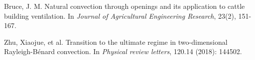 \documentclass{article}
\begin{document}
  


\begin{thebibliography}{1}

Bruce, J. M. 
\newblock Natural convection through openings and its application to cattle building ventilation. 
\newblock In {\em Journal of Agricultural Engineering Research}, 23(2), 151-167.

Zhu, Xiaojue, et al.
\newblock Transition to the ultimate regime in two-dimensional Rayleigh-Bénard convection.
\newblock In {\em Physical review letters}, 120.14 (2018): 144502.

\end{thebibliography}
\end{document}
